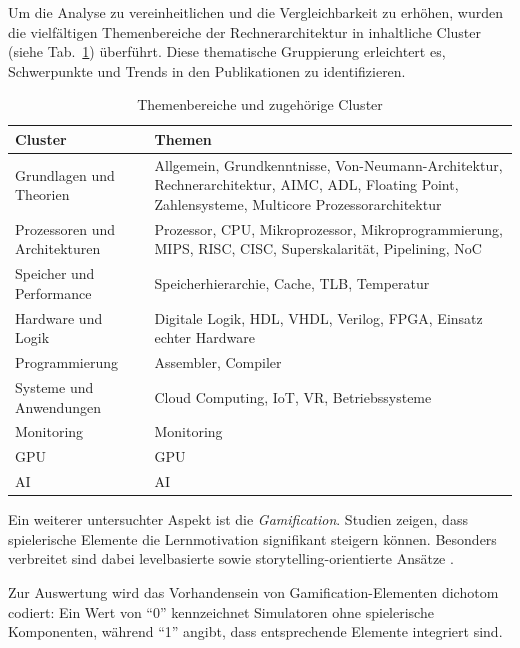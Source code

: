 Um die Analyse zu vereinheitlichen und die Vergleichbarkeit zu erhöhen, wurden die vielfältigen Themenbereiche der Rechnerarchitektur in inhaltliche Cluster (siehe Tab.~\ref{tab:cluster}) überführt. Diese thematische Gruppierung erleichtert es, Schwerpunkte und Trends in den Publikationen zu identifizieren.

\begin{table}[h]
  \centering
  \caption{Themenbereiche und zugehörige Cluster}
  \label{tab:cluster}
  \tiny
  \begin{tabularx}{\textwidth}{lX}
    \toprule
    \textbf{Cluster} & \textbf{Themen} \\
    \midrule
    Grundlagen und Theorien & Allgemein, Grundkenntnisse, Von-Neumann-Architektur, Rechnerarchitektur, AIMC, ADL, Floating Point, Zahlensysteme, Multicore Prozessorarchitektur \\
    \addlinespace
    Prozessoren und Architekturen & Prozessor, CPU, Mikroprozessor, Mikroprogrammierung, MIPS, RISC, CISC, Superskalarität, Pipelining, NoC \\
    \addlinespace
    Speicher und Performance & Speicherhierarchie, Cache, TLB, Temperatur \\
    \addlinespace
    Hardware und Logik & Digitale Logik, HDL, VHDL, Verilog, FPGA, Einsatz echter Hardware \\
    \addlinespace
    Programmierung & Assembler, Compiler \\
    \addlinespace
    Systeme und Anwendungen & Cloud Computing, IoT, VR, Betriebssysteme \\
    \addlinespace
    Monitoring & Monitoring \\
    \addlinespace
    GPU & GPU \\
    \addlinespace
    AI & AI \\
    \bottomrule
  \end{tabularx}
\end{table}

Ein weiterer untersuchter Aspekt ist die \textit{Gamification}. Studien zeigen, dass spielerische Elemente die Lernmotivation signifikant steigern können. Besonders verbreitet sind dabei levelbasierte sowie storytelling-orientierte Ansätze \parencites[S.~106f.]{sailer_gamification_2020}[S.~13]{baah_enhancing_2024}.

Zur Auswertung wird das Vorhandensein von Gamification-Elementen dichotom codiert: Ein Wert von \enquote{0} kennzeichnet Simulatoren ohne spielerische Komponenten, während \enquote{1} angibt, dass entsprechende Elemente integriert sind.


